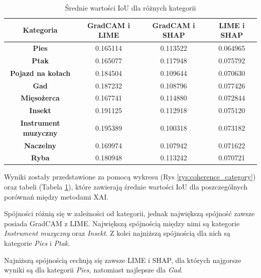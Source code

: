 \begin{table}[h]
	\centering
	\begin{tabular}{|c|c|c|c|}
		\hline
		\textbf{Kategoria}           & \textbf{GradCAM i LIME} & \textbf{GradCAM i SHAP} & \textbf{LIME i SHAP} \\
		\hline
		\textbf{Pies}                & 0.165114                & 0.113522                & 0.064965             \\
		\hline
		\textbf{Ptak}                & 0.165077                & 0.117948                & 0.075792             \\
		\hline
		\textbf{Pojazd na kołach}    & 0.184504                & 0.109644                & 0.070630             \\
		\hline
		\textbf{Gad}                 & 0.187232                & 0.108796                & 0.077426             \\
		\hline
		\textbf{Mięsożerca}          & 0.167741                & 0.114880                & 0.072844             \\
		\hline
		\textbf{Insekt}              & 0.191125                & 0.112918                & 0.075120             \\
		\hline
		\textbf{Instrument muzyczny} & 0.195389                & 0.100318                & 0.073182             \\
		\hline
		\textbf{Naczelny}            & 0.169974                & 0.107942                & 0.071622             \\
		\hline
		\textbf{Ryba}                & 0.180948                & 0.113242                & 0.070721             \\
		\hline
	\end{tabular}
	\caption{Średnie wartości IoU dla różnych kategorii}
	\label{tab:base_coherence_categories}
\end{table}

Wyniki zostały przedstawione za pomocą wykresu (Rys \ref{rys:coherence_category}) oraz tabeli (Tabela \ref{tab:base_coherence_categories}), które zawierają średnie wartości IoU dla poszczególnych porównań między metodami XAI.

Spójności różnią się w zależności od kategorii, jednak największą spójność zawsze posiada GradCAM z LIME.
Największą spójnością między nimi są kategorie \textit{Instrument muzyczny} oraz \textit{Insekt}.
Z kolei najniższą spójnością dla nich są kategorie \textit{Pies} i \textit{Ptak}.

Najniższą spójnością cechują się zawsze LIME i SHAP, dla których najgorsze wyniki są dla kategorii \textit{Pies}, natomiast najlepsze dla \textit{Gad}.

